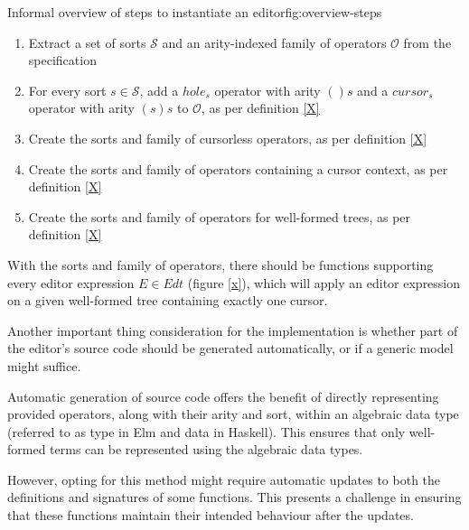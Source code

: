 \documentclass{article}
\begin{document}
\begin{myfigure}{Informal overview of steps to instantiate an editor}{fig:overview-steps}
\begin{enumerate}
    \item Extract a set of sorts $\mathcal{S}$ and an arity-indexed family of operators $\mathcal{O}$ from the specification
    \item For every sort $s \in \mathcal{S}$, add a $hole_s$ operator with arity $()s$ and a $cursor_s$ operator with arity $(s)s$ to $\mathcal{O}$, as per definition \ref{X}
    \item Create the sorts and family of cursorless operators, as per definition \ref{X}
    \item Create the sorts and family of operators containing a cursor context, as per definition \ref{X}
    \item Create the sorts and family of operators for well-formed trees, as per definition \ref{X}
\end{enumerate}
\end{myfigure}

With the sorts and family of operators, there should be functions supporting every editor expression $E \in Edt$ (figure \ref{x}), which will apply an editor expression on a given well-formed tree containing exactly one cursor.  

Another important thing consideration for the implementation is whether part of the editor's source code should be generated automatically, or if a generic model might suffice.

Automatic generation of source code offers the benefit of directly representing provided operators, along with their arity and sort, within an algebraic data type (referred to as type in Elm and data in Haskell). This ensures that only well-formed terms can be represented using the algebraic data types.

However, opting for this method might require automatic updates to both the definitions and signatures of some functions. This presents a challenge in ensuring that these functions maintain their intended behaviour after the updates.
\end{document}
